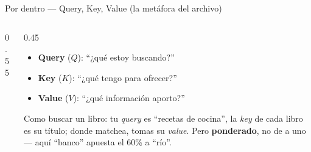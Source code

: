 \documentclass[aspectratio=169, 11pt]{beamer}
\begin{document}
\begin{frame}[shrink]{Por dentro --- Query, Key, Value (la metáfora del archivo)}
\begin{columns}[c]
\begin{column}{0.55\textwidth}
\begin{center}
      \end{center}
    \end{column}
    \begin{column}{0.45\textwidth}
      \vspace{2pt}
      \begin{itemize}\setlength{\itemsep}{6pt}
        \footnotesize
        \item \textbf{\color{codeBlue}Query} ($Q$):
        ``¿qué estoy buscando?''
        \item \textbf{\color{codeOrange}Key} ($K$):
        ``¿qué tengo para ofrecer?''
        \item \textbf{\color{codeGreen}Value} ($V$):
        ``¿qué información aporto?''
      \end{itemize}
      \vspace{6pt}
      \begin{tcolorbox}[colback=arcaGray, colframe=arcaRed, leftrule=3pt,
        boxrule=0pt, sharp corners, left=6pt, right=6pt, top=4pt, bottom=4pt]
        {\scriptsize\color{arcaDark}
        Como buscar un libro: tu \emph{query} es ``recetas de cocina'', la \emph{key}
        de cada libro es su título; donde matchea, tomas su \emph{value}.
        Pero \textbf{ponderado}, no de a uno --- aquí ``banco'' apuesta el 60\% a ``río''.}
      \end{tcolorbox}
    \end{column}
  \end{columns}
\end{frame}
\end{document}
